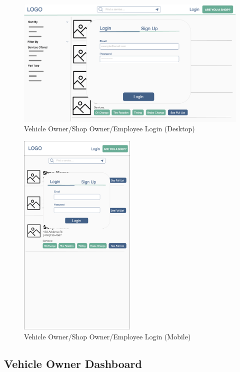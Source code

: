 \documentclass[12pt, titlepage]{article}
\begin{document}
\begin{figure}[H]
	\centering
	\includegraphics[width=\textwidth]{mockups/Vehicle-Shop Owner Login Popup (Desktop).png}
	\caption{Vehicle Owner/Shop Owner/Employee Login (Desktop)}
\end{figure}

\begin{figure}[H]
	\centering
	\includegraphics[width=0.5\textwidth]{mockups/Vehicle-Shop Owner Login Popup (Mobile).png}
	\caption{Vehicle Owner/Shop Owner/Employee Login (Mobile)}
\end{figure}

\subsection{Vehicle Owner Dashboard}
\end{document}
